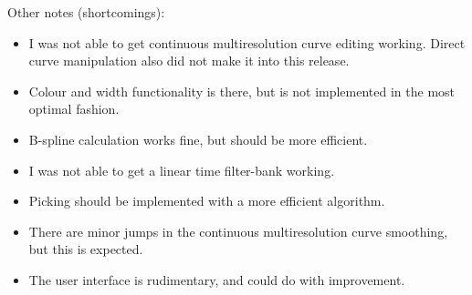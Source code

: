 \documentclass[11pt]{article}
\begin{document}
Other notes (shortcomings):
\begin{itemize}
\item I was not able to get continuous multiresolution curve editing working. Direct curve manipulation also did not make it into this release.
\item Colour and width functionality is there, but is not implemented in the most optimal fashion.
\item B-spline calculation works fine, but should be more efficient.
\item I was not able to get a linear time filter-bank working.
\item Picking should be implemented with a more efficient algorithm.
\item There are minor jumps in the continuous multiresolution curve smoothing, but this is expected.
\item The user interface is rudimentary, and could do with improvement.
\end{itemize}

\newpage

\end{document}
